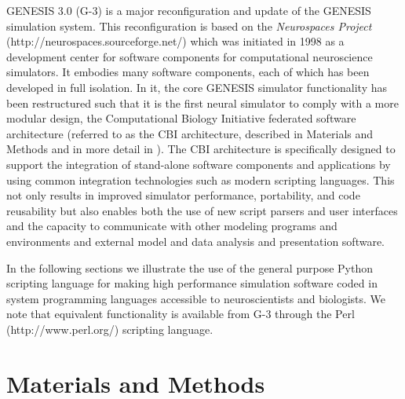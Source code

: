 \documentclass[10pt]{article}
\begin{document}
GENESIS 3.0 (G-3) is a major reconfiguration and update of the GENESIS
simulation system.  This reconfiguration is based on the {\it Neurospaces Project} (http://neurospaces.sourceforge.net/) which was initiated in 1998 as a development center for software components for computational neuroscience simulators. It embodies many software components, each of which has been developed in full isolation. In it, the core GENESIS simulator functionality has been
restructured such that it is the first neural simulator to comply with a more modular design, the Computational 
Biology Initiative federated software architecture (referred to as the CBI
 architecture, described in Materials and Methods and in more detail in \cite{cornelis11b}).
The CBI
architecture is specifically designed to support
the integration of stand-alone software components and applications by
using common integration technologies such as modern scripting
languages. This not only results in
improved simulator performance, portability, and code reusability but also enables both the
use of new script parsers and user interfaces and the capacity
to communicate with other modeling programs and environments and external model and data analysis and presentation software.

In the following sections we illustrate the use of the general purpose Python scripting
language for making high performance simulation software coded in
system programming languages accessible to neuroscientists and
biologists. We note that equivalent functionality is available from G-3 through the Perl (http://www.perl.org/) scripting language. 

\section*{\LARGE Materials and Methods}
\end{document}
